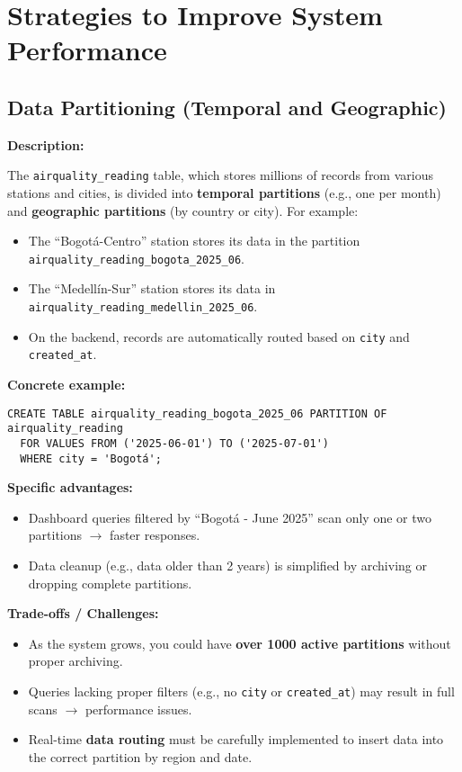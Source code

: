 \section{Strategies to Improve System Performance}

\subsection{Data Partitioning (Temporal and Geographic)}

\textbf{Description:}

The \texttt{airquality\_reading} table, which stores millions of records from various stations and cities, is divided into \textbf{temporal partitions} (e.g., one per month) and \textbf{geographic partitions} (by country or city). For example:

\begin{itemize}
  \item The ``Bogot\'a-Centro'' station stores its data in the partition  \\
  \texttt{airquality\_reading\_bogota\_2025\_06}.
  \item The ``Medell\'in-Sur'' station stores its data in \texttt{airquality\_reading\_medellin\_2025\_06}.
  \item On the backend, records are automatically routed based on \texttt{city} and \texttt{created\_at}.
\end{itemize}

\textbf{Concrete example:}

\begin{verbatim}
CREATE TABLE airquality_reading_bogota_2025_06 PARTITION OF airquality_reading
  FOR VALUES FROM ('2025-06-01') TO ('2025-07-01')
  WHERE city = 'Bogotá';
\end{verbatim}

\textbf{Specific advantages:}
\begin{itemize}
  \item Dashboard queries filtered by ``Bogotá - June 2025'' scan only one or two partitions $\rightarrow$ faster responses.
  \item Data cleanup (e.g., data older than 2 years) is simplified by archiving or dropping complete partitions.
\end{itemize}

\textbf{Trade-offs / Challenges:}
\begin{itemize}
  \item As the system grows, you could have \textbf{over 1000 active partitions} without proper archiving.
  \item Queries lacking proper filters (e.g., no \texttt{city} or \texttt{created\_at}) may result in full scans $\rightarrow$ performance issues.
  \item Real-time \textbf{data routing} must be carefully implemented to insert data into the correct partition by region and date.
\end{itemize}


